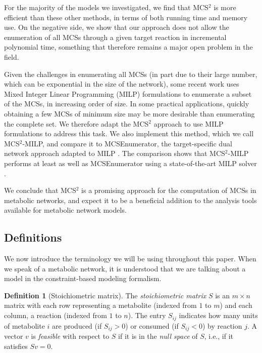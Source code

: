 \documentclass{bioinfo}
\theoremstyle{plain}
\theoremstyle{definition}
\newtheorem{definition}{Definition} %
\begin{document}
For the majority of the models we investigated, we find that MCS$^2$ is more efficient than these other methods, in terms of both running time and memory use. On the negative side, we show that our approach does not allow the enumeration of all MCSs through a given target reaction in incremental polynomial time, something that therefore remains a major open problem in the field.

Given the challenges in enumerating all MCSs (in part due to their large number, which can be exponential in the size of the network), some recent work \cite{MCSs-MILP-Dual,MCSs-MILP-Dual2} uses Mixed Integer Linear Programming (MILP) formulations to enumerate a subset of the MCSs, in increasing order of size. In some practical applications, quickly obtaining a few MCSs of minimum size may be more desirable than enumerating the complete set.
We therefore adapt the MCS$^2$ approach to use MILP formulations to address this task. 
We also implement this method, which we call MCS$^2$-MILP, and compare it to MCSEnumerator, the target-specific dual network approach adapted to MILP  \cite{MCSs-MILP-Dual}. The comparison shows that MCS$^2$-MILP performs at least as well as MCSEnumerator using a state-of-the-art MILP solver \cite{CPLEX}.

We conclude that MCS$^2$ is a promising approach for the computation of MCSs in metabolic networks, and expect it to be a beneficial addition to the analysis tools available for metabolic network models.

\subsection{Definitions}

We now introduce the terminology we will be using throughout this paper. When we speak of a metabolic network, it is understood that we are talking about a model in the constraint-based modeling formalism.

\begin{definition} [Stoichiometric matrix]
    The \emph{stoichiometric matrix} $S$ is an $m \times n$ matrix with each row representing a metabolite (indexed from $1$ to $m$) and each column, a reaction (indexed from $1$ to $n$). The entry $S_{ij}$ indicates how many units of metabolite $i$ are produced (if $S_{ij} > 0$) or consumed (if $S_{ij} < 0$) by reaction $j$. A vector $v$ is \textit{feasible} with respect to $S$ if it is in the \emph{null space} of $S$, i.e., if it satisfies $Sv = 0$.
\end{definition}
\end{document}
